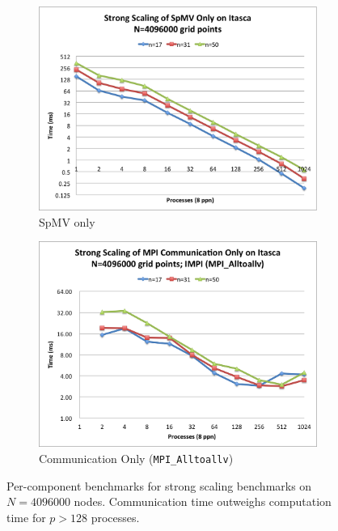\documentclass{report}
\begin{document}
\begin{figure} 
\centering
\begin{subfigure}{0.48\textwidth}
\centering
\includegraphics[width=\textwidth]{performance_content/scaling/strong_scaling_4M_regular_spmvOnly.png}
\caption{SpMV only}
\label{fig:strong_scaling_spmv_only_alltoallv_all_stencils}
\end{subfigure}
\begin{subfigure}{0.48\textwidth}
\centering
\includegraphics[width=\textwidth]{performance_content/scaling/strong_scaling_4M_regular_alltoallv_commOnly.png} \caption{Communication Only (\texttt{MPI\_Alltoallv})}
\label{fig:strong_scaling_comm_only_alltoallv_all_stencils}
\end{subfigure}
\caption{Per-component benchmarks for strong scaling benchmarks on $N=4096000$ nodes. Communication time outweighs computation time for $p>128$ processes.  }
\end{figure}
\end{document}
